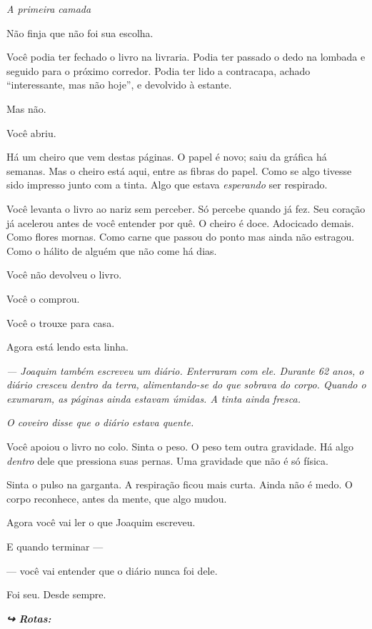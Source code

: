 
\noindent \textit{A primeira camada}

\noindent Não finja que não foi sua escolha.

\noindent Você podia ter fechado o livro na livraria. Podia ter passado o dedo na lombada e seguido para o próximo corredor. Podia ter lido a contracapa, achado \textquotedblleft{}interessante, mas não hoje\textquotedblright{}, e devolvido à estante.

\noindent Mas não.

\noindent Você abriu.

\noindent Há um cheiro que vem destas páginas. O papel é novo; saiu da gráfica há semanas. Mas o cheiro está aqui, entre as fibras do papel. Como se algo tivesse sido impresso junto com a tinta. Algo que estava \textit{esperando} ser respirado.

\noindent Você levanta o livro ao nariz sem perceber. Só percebe quando já fez. Seu coração já acelerou antes de você entender por quê. O cheiro é doce. Adocicado demais. Como flores mornas. Como carne que passou do ponto mas ainda não estragou. Como o hálito de alguém que não come há dias.

\noindent Você não devolveu o livro.

\noindent Você o comprou.

\noindent Você o trouxe para casa.

\noindent Agora está lendo esta linha.

\noindent \textit{--- Joaquim também escreveu um diário. Enterraram com ele. Durante 62 anos, o diário cresceu dentro da terra, alimentando-se do que sobrava do corpo. Quando o exumaram, as páginas ainda estavam úmidas. A tinta ainda fresca.}

\noindent \textit{O coveiro disse que o diário estava quente.}

\noindent Você apoiou o livro no colo. Sinta o peso. O peso tem outra gravidade. Há algo \textit{dentro} dele que pressiona suas pernas. Uma gravidade que não é só física.

\noindent Sinta o pulso na garganta. A respiração ficou mais curta. Ainda não é medo. O corpo reconhece, antes da mente, que algo mudou.

\noindent Agora você vai ler o que Joaquim escreveu.

\noindent E quando terminar ---

\noindent --- você vai entender que o diário nunca foi dele.

\noindent Foi seu. Desde sempre.

\vspace{0.5em}
\noindent\textit{\textbf{↪ Rotas:}  \rotasep {} \rotasep {}}